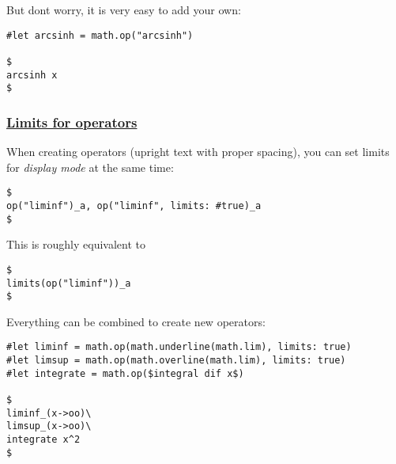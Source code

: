 But don\textquotesingle t worry, it is very easy to add your own:

\begin{verbatim}
#let arcsinh = math.op("arcsinh")

$
arcsinh x
$
\end{verbatim}

\pandocbounded{}

\subsubsection{\texorpdfstring{\hyperref[limits-for-operators]{Limits
for operators}}{Limits for operators}}\label{limits-for-operators}

When creating operators (upright text with proper spacing), you can set
limits for \emph{display mode} at the same time:

\begin{verbatim}
$
op("liminf")_a, op("liminf", limits: #true)_a
$
\end{verbatim}

\pandocbounded{}

This is roughly equivalent to

\begin{verbatim}
$
limits(op("liminf"))_a
$
\end{verbatim}

\pandocbounded{}

Everything can be combined to create new operators:

\begin{verbatim}
#let liminf = math.op(math.underline(math.lim), limits: true)
#let limsup = math.op(math.overline(math.lim), limits: true)
#let integrate = math.op($integral dif x$)

$
liminf_(x->oo)\
limsup_(x->oo)\
integrate x^2
$
\end{verbatim}

\pandocbounded{}
